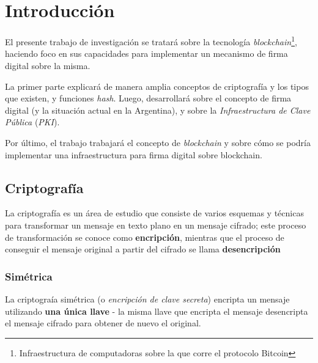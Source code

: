 







\clearpage
\tableofcontents
\clearpage 

\lstset{style=bashstyle}

\section{Introducción}

El presente trabajo de investigación se tratará sobre la tecnología \emph{blockchain}\footnote{Infraestructura de computadoras sobre la que corre el protocolo Bitcoin}, haciendo foco en sus capacidades para implementar un mecanismo de firma digital sobre la misma.

La primer parte explicará de manera amplia conceptos de criptografía y los tipos que existen, y funciones \emph{hash}. Luego, desarrollará sobre el concepto de firma digital (y la situación actual en la Argentina), y sobre la \emph{Infraestructura de Clave Pública} (\emph{PKI}).

Por último, el trabajo trabajará el concepto de \emph{blockchain} y sobre cómo se podría implementar una infraestructura para firma digital sobre blockchain.

\subsection{Criptografía}

La criptografía es un área de estudio que consiste de varios esquemas y técnicas para transformar un mensaje en texto plano en un mensaje cifrado; este proceso de transformación se conoce como \textbf{encripción}, mientras que el proceso de conseguir el mensaje original a partir del cifrado se llama \textbf{desencripción} \autocite{StallingsCryptography}

\subsubsection{Simétrica}

La criptograía simétrica (o \emph{encripción de clave secreta}) encripta un mensaje utilizando \textbf{una única llave} - la misma llave que encripta el mensaje desencripta el mensaje cifrado para obtener de nuevo el original. 

